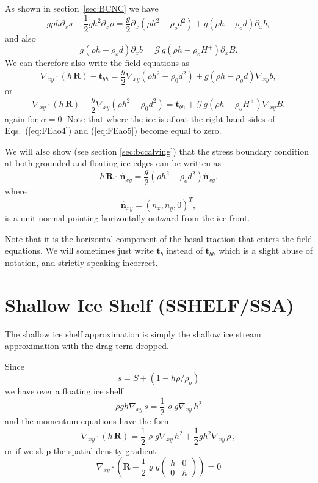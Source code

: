 \documentclass[10pt,a4paper]{book}
\newcommand{\G}{\mathcal{G}}
\newcommand{\p}{\partial}
\newcommand{\normal}{\hat{\bm{n}}}
\begin{document}
As shown in section~\ref{sec:BCNC} we have
\begin{equation}
 g  \rho h \p_x s + \frac{1}{2} g h^2 \p_x \rho  = \frac{g}{2}  \p_x (\rho h^2 - \rho_o d^2)+g(\rho h -\rho_o d) \p_x b ,
\label{eq:gencasea}
\end{equation}
and also
\begin{equation}
g(\rho h -\rho_o d) \p_x b  =  \G \, g(\rho h -\rho_o H^{+}) \p_x B .
\end{equation}
We can therefore also write the field equations as 
\begin{equation}
\nabla_{xy} \cdot (h \, \bm{R}) - \bm{t}_{bh} = \frac{g}{2} \nabla_{xy}  ( \rho h^2 - \rho_0 d^2)   + g (\rho h - \rho_o d) \nabla_{xy} b,
\label{eq:FEao4}
\end{equation}
or
\begin{equation}
\nabla_{xy} \cdot (h \, \bm{R})  - \frac{g}{2} \nabla_{xy}  ( \rho h^2 - \rho_0 d^2)   = \bm{t}_{bh} +  \G \, g(\rho h -\rho_o H^{+}) \nabla_{xy} B .
\label{eq:FEao5}
\end{equation}
again for $\alpha=0$. Note that where the ice is afloat the right hand
sides of Eqs.~(\ref{eq:FEao4}) and (\ref{eq:FEao5}) become equal to
zero.

We will also show (see section
\ref{sec:bccalving}) that the stress boundary condition at both
grounded and floating ice edges can be written as
\begin{equation}
h \, \bm{R} \cdot \, \normal_{xy}=\frac{g}{2} ( \rho h^2-\rho_o d^2) \normal_{xy} .
\label{eq:BCCFa}
\end{equation}
where
\[
\normal_{xy}=(n_x,n_y,0)^T ,
\] 
is a unit normal pointing horizontally outward from the ice front.

Note that it is the horizontal component of the basal traction that
enters the field equations. We will sometimes just write $\bm{t}_b$
instead of $\bm{t}_{bh}$ which is a slight abuse of notation, and
strictly speaking incorrect. 

\section{Shallow Ice Shelf (SSHELF/SSA)}


The shallow ice shelf approximation is simply the shallow ice stream
approximation with the drag term dropped. 

Since 
\[
s= S+(1-h \rho/\rho_o )
\]
we have over a floating ice shelf
\[
  \rho g h \nabla_{xy}  \, s  =   \frac{1}{2} \varrho g  \nabla_{xy}  \, h^2  
\]
and the momentum equations have the form
\begin{equation}
\nabla_{xy} \cdot (h \, \bm{R}) =  \frac{1}{2} \varrho g  \nabla_{xy}  \, h^2   + \frac{1}{2} g h^2 \nabla_{xy} \, \rho \, ,
\label{eq:FEao2}
\end{equation}
or if we skip the spatial density gradient
\begin{equation}
\nabla_{xy} \cdot \left (  \bm{R} 
-  \frac{1}{2} \varrho g   \begin{pmatrix} h & 0 \\ 0 & h \end{pmatrix}  \right ) = 0
\end{equation}
\end{document}

